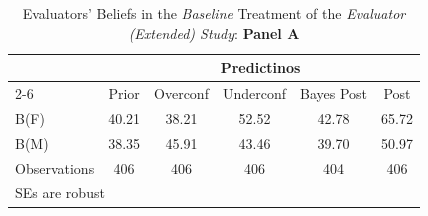 \begin{table}[htbp]\centering
\caption{Evaluators' Beliefs in the \textit{Baseline} Treatment of the \textit{Evaluator (Extended) Study}: \textbf{Panel A}}
\begin{tabular}{l*{5}{c}}
\hline\hline
                &\multicolumn{5}{c}{Predictinos}                  \\\cmidrule(lr){2-6}
                &\multicolumn{1}{c}{Prior}&\multicolumn{1}{c}{Overconf}&\multicolumn{1}{c}{Underconf}&\multicolumn{1}{c}{Bayes Post}&\multicolumn{1}{c}{Post}\\
\hline
B(F)            &    40.21&    38.21&    52.52&    42.78&    65.72\\
B(M)            &    38.35&    45.91&    43.46&    39.70&    50.97\\
\hline
Observations    &      406&      406&      406&      404&      406\\
\hline\hline
\multicolumn{6}{l}{\footnotesize SEs are robust}\\
\end{tabular}
\end{table}
